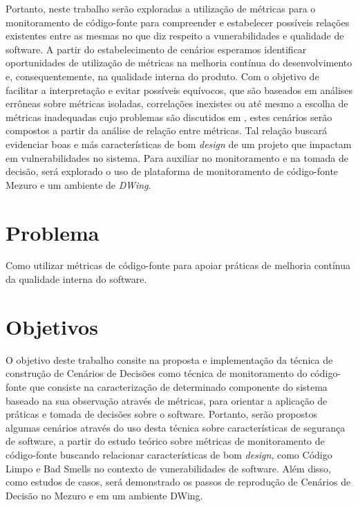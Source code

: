 %

Portanto, neste trabalho serão exploradas a utilização de métricas para o monitoramento de código-fonte para compreender e estabelecer possíveis relações existentes entre as mesmas no que diz respeito a vunerabilidades e qualidade de software. A partir do estabelecimento de cenários esperamos identificar oportunidades de utilização de métricas na melhoria contínua do desenvolvimento e, consequentemente, na qualidade interna do produto. Com o objetivo de facilitar a interpretação e evitar possíveis equívocos, que são baseados em análises errôneas sobre métricas isoladas, correlações inexistes ou até mesmo a escolha de métricas inadequadas cujo problemas são discutidos em \cite{chidamber1994}, estes cenários serão compostos a partir da análise de relação entre métricas. Tal relação buscará evidenciar boas e más características de bom \emph{design} de um projeto que impactam em vulnerabilidades no sistema.
%
Para auxiliar no monitoramento e na tomada de decisão, será explorado o uso de plataforma de monitoramento de código-fonte Mezuro e um ambiente de \emph{DWing}.



\section{Problema}

%
Como utilizar métricas de código-fonte para apoiar práticas de melhoria contínua da qualidade interna do software.

\section{Objetivos}

O objetivo deste trabalho consite na proposta e implementação da técnica de construção de Cenários de Decisões como técnica de monitoramento do código-fonte que consiste na caracterização de determinado componente do sistema baseado na sua observação através de métricas, para orientar a aplicação de práticas e tomada de decisões sobre o software. Portanto, serão propostos algumas cenários através do uso desta técnica sobre características de segurança de software, a partir do estudo teórico sobre métricas de monitoramento de código-fonte buscando relacionar características de bom \emph{design}, como Código Limpo e Bad Smells no contexto de vunerabilidades de software. Além disso, como estudos de casos, será demonstrado os passos de reprodução de Cenários de Decisão no Mezuro e em um ambiente DWing.

